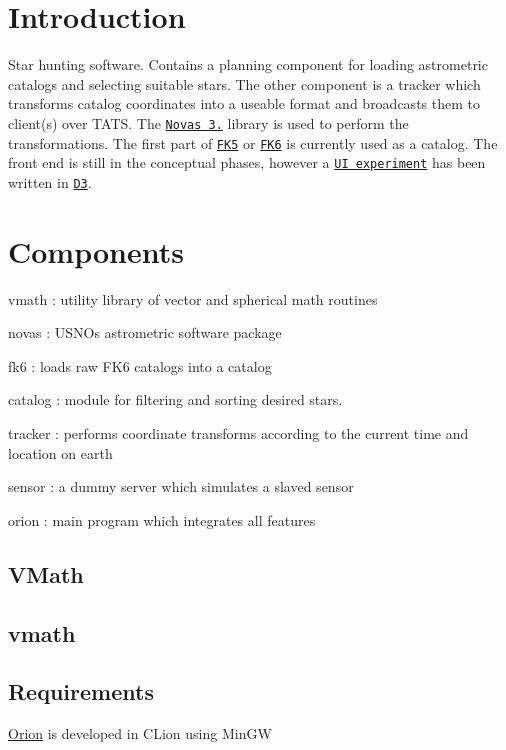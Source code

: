 \hypertarget{index_intro_sec}{}\section{Introduction}\label{index_intro_sec}
Star hunting software. Contains a planning component for loading astrometric catalogs and selecting suitable stars. The other component is a tracker which transforms catalog coordinates into a useable format and broadcasts them to client(s) over T\+A\+TS. The \href{http://aa.usno.navy.mil/software/novas/novas_info.php}{\tt Novas 3.} library is used to perform the transformations. The first part of \href{http://www-kpno.kpno.noao.edu/Info/Caches/Catalogs/FK5/fk5.html}{\tt F\+K5} or \href{http://cdsarc.u-strasbg.fr/viz-bin/Cat?I/264}{\tt F\+K6} is currently used as a catalog. The front end is still in the conceptual phases, however a \href{https://caseyshields.github.io/starlog/index.html}{\tt UI experiment} has been written in \href{https://d3js.org/}{\tt D3}.\hypertarget{index_component_sec}{}\section{Components}\label{index_component_sec}

\begin{DoxyItemize}
\item vmath \+: utility library of vector and spherical math routines
\item novas \+: U\+S\+NO\textquotesingle{}s astrometric software package
\item fk6 \+: loads raw F\+K6 catalogs into a catalog
\item catalog \+: module for filtering and sorting desired stars.
\item tracker \+: performs coordinate transforms according to the current time and location on earth
\item sensor \+: a dummy server which simulates a slaved sensor
\item orion \+: main program which integrates all features
\end{DoxyItemize}\hypertarget{index_vmath}{}\subsection{V\+Math}\label{index_vmath}
\subsection*{vmath}

\subsection*{Requirements}


\begin{DoxyItemize}
\item \mbox{\hyperlink{struct_orion}{Orion}} is developed in C\+Lion using Min\+GW 
\end{DoxyItemize}